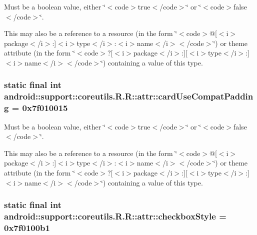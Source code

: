 Must be a boolean value, either \char`\"{}$<$code$>$true$<$/code$>$\char`\"{} or \char`\"{}$<$code$>$false$<$/code$>$\char`\"{}. 

This may also be a reference to a resource (in the form \char`\"{}$<$code$>$@\mbox{[}$<$i$>$package$<$/i$>$:\mbox{]}$<$i$>$type$<$/i$>$:$<$i$>$name$<$/i$>$$<$/code$>$\char`\"{}) or theme attribute (in the form \char`\"{}$<$code$>$?\mbox{[}$<$i$>$package$<$/i$>$:\mbox{]}\mbox{[}$<$i$>$type$<$/i$>$:\mbox{]}$<$i$>$name$<$/i$>$$<$/code$>$\char`\"{}) containing a value of this type. \hypertarget{classandroid_1_1support_1_1coreutils_1_1_r_1_1attr_8f10769a8480dafaf132424a632e8d44}{
\subsubsection[{cardUseCompatPadding}]{\setlength{\rightskip}{0pt plus 5cm}static final int android::support::coreutils.R.R::attr::cardUseCompatPadding = 0x7f010015}}
\label{classandroid_1_1support_1_1coreutils_1_1_r_1_1attr_8f10769a8480dafaf132424a632e8d44}


Must be a boolean value, either \char`\"{}$<$code$>$true$<$/code$>$\char`\"{} or \char`\"{}$<$code$>$false$<$/code$>$\char`\"{}. 

This may also be a reference to a resource (in the form \char`\"{}$<$code$>$@\mbox{[}$<$i$>$package$<$/i$>$:\mbox{]}$<$i$>$type$<$/i$>$:$<$i$>$name$<$/i$>$$<$/code$>$\char`\"{}) or theme attribute (in the form \char`\"{}$<$code$>$?\mbox{[}$<$i$>$package$<$/i$>$:\mbox{]}\mbox{[}$<$i$>$type$<$/i$>$:\mbox{]}$<$i$>$name$<$/i$>$$<$/code$>$\char`\"{}) containing a value of this type. \hypertarget{classandroid_1_1support_1_1coreutils_1_1_r_1_1attr_06b22fe8ceee4c9cfdcb61b34ed41bf1}{
\subsubsection[{checkboxStyle}]{\setlength{\rightskip}{0pt plus 5cm}static final int android::support::coreutils.R.R::attr::checkboxStyle = 0x7f0100b1}}
\label{classandroid_1_1support_1_1coreutils_1_1_r_1_1attr_06b22fe8ceee4c9cfdcb61b34ed41bf1}


